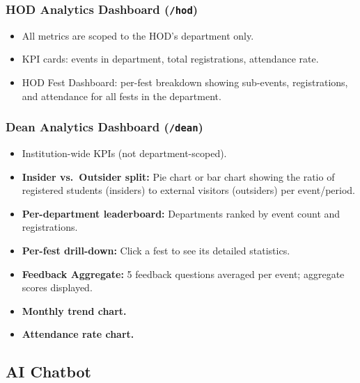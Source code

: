 \documentclass[12pt,a4paper]{article}
\begin{document}
\subsubsection{HOD Analytics Dashboard (\texttt{/hod})}

\begin{itemize}[leftmargin=*]
    \item All metrics are scoped to the HOD's department only.
    \item KPI cards: events in department, total registrations, attendance rate.
    \item HOD Fest Dashboard: per-fest breakdown showing sub-events, registrations, and attendance for all fests in the department.
\end{itemize}

\subsubsection{Dean Analytics Dashboard (\texttt{/dean})}

\begin{itemize}[leftmargin=*]
    \item Institution-wide KPIs (not department-scoped).
    \item \textbf{Insider vs.\ Outsider split:} Pie chart or bar chart showing the ratio of registered students (insiders) to external visitors (outsiders) per event/period.
    \item \textbf{Per-department leaderboard:} Departments ranked by event count and registrations.
    \item \textbf{Per-fest drill-down:} Click a fest to see its detailed statistics.
    \item \textbf{Feedback Aggregate:} 5 feedback questions averaged per event; aggregate scores displayed.
    \item \textbf{Monthly trend chart.}
    \item \textbf{Attendance rate chart.}
\end{itemize}

\subsection{AI Chatbot}
\end{document}
